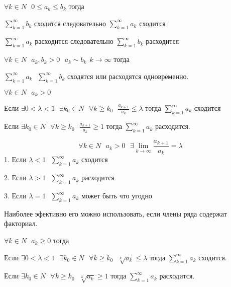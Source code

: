 \documentclass{article}
\begin{document}
\begin{block}
  $\forall k \in N ~~~ 0 \le a_k \le b_k$ тогда

  $\sum_{k=1}^{\infty} b_k$ сходится следовательно $\sum_{k=1}^{\infty} a_k$
  сходится

  $\sum_{k=1}^{\infty} a_k$ расходится следовательно $\sum_{k=1}^{\infty} b_k$
  расходится
\end{block}

\begin{block}
  $\forall k \in N ~~~ a_k, b_k > 0 ~~~ a_k \sim b_k ~~ k \to \infty$ тогда

  $\sum_{k=1}^{\infty} a_k ~~~ \sum_{k=1}^{\infty} b_k$
  сходятся или расходятся одновременно.
\end{block}

\begin{block}
  $\forall k \in N ~~~ a_k > 0$

  Если $\exists 0 < \lambda < 1 ~~~ \exists k_0 \in N ~~~ \forall k \ge k_0 ~~~
  \frac{a_{k+1}}{a_k} \le \lambda$ тогда $\sum_{k=1}^{\infty} a_k$ сходится

  Если $\exists k_0 \in N ~~~ \forall k \ge k_0 ~~~ \frac{a_{k+1}}{a_k} \ge 1$
  тогда $\sum_{k=1}^{\infty} a_k$ расходится.
\end{block}

\begin{block}
  $$
  \forall k \in N ~~~ a_k > 0 ~~~
  \exists \lim_{k \to \infty} \frac{a_{k+1}}{a_k} = \lambda
  $$
  1. Если $\lambda < 1 ~~~ \sum_{k=1}^{\infty} a_k$ сходится

  2. Если $\lambda > 1 ~~~ \sum_{k=1}^{\infty} a_k$ расходится

  3. Если $\lambda = 1 ~~~ \sum_{k=1}^{\infty} a_k$ может быть что угодно

  Наиболее эфективно его можно использовать, если члены ряда содержат факториал.
\end{block}

\begin{block}
  $\forall k \in N ~~~ a_k \ge 0 $ тогда

  Если $\exists 0 < \lambda < 1 ~~~ \exists k_0 \in N ~~~ \forall k \ge k_0 ~~~
  \sqrt[k]{a_k} \le \lambda$ тогда $\sum_{k=1}^{\infty} a_k$ сходится.

  Если $\exists k_0 \in N ~~~ \forall k \ge k_0 ~~~ \sqrt[k]{a_k} \ge 1$ тогда
  $\sum_{k=1}^{\infty} a_k$ расходится.
\end{block}
\end{document}
